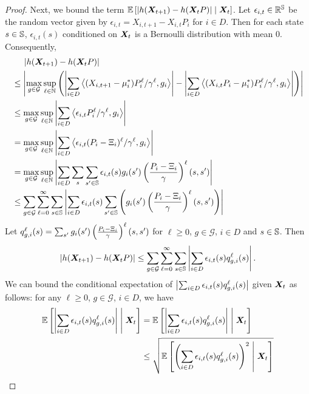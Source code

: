 \begin{proof}
Next, we bound the term $\mathbb{E}\left[\left\lvert h({\bm{X}}_{t+1})-h({\bm{X}}_tP)\right\rvert\;\middle|\;{\bm{X}}_t\right]$. 
Let $\epsilon_{i,t} \in \mathbb{R}^{\mathbb{S}}$ be the random vector given by $\epsilon_{i,t} = X_{i,t+1}-X_{i,t}P_i$ for $i\in D$. Then for each state $s\in\mathbb{S}$, $\epsilon_{i,t}(s)$ conditioned on ${\bm{X}}_t$ is a Bernoulli distribution with mean $0$. Consequently, 
\begin{align}
    \nonumber
    &\mspace{23mu} \left\lvert h({\bm{X}}_{t+1})-h({\bm{X}}_tP)\right\rvert\\
    \nonumber
    &\leq \left\lvert\max_{g\in \mathcal{G}} \sup_{\ell\in\mathbb{N}} \left(\left\lvert\sum_{i\in D}\left\langle (X_{i,t+1}-\mu_i^*)P_i^{\ell}/\gamma^{\ell}, g_i \right\rangle\right\rvert-\left\lvert\sum_{i\in D} \left\langle (X_{i,t}P_i-\mu_i^*)P_i^{\ell}/\gamma^{\ell}, g_i \right\rangle\right\rvert\right)\right\rvert\\ 
    \nonumber 
    &\leq \max_{g\in \mathcal{G}} \sup_{\ell\in\mathbb{N}} \left\lvert\sum_{i\in D}\left\langle \epsilon_{i,t}P_i^{\ell}/\gamma^{\ell}, g_i \right\rangle\right\rvert \\
    \nonumber
    &= \max_{g\in \mathcal{G}} \sup_{\ell\in\mathbb{N}} \left\lvert\sum_{i\in D}\left\langle \epsilon_{i,t}(P_i-\Xi_i)^{\ell}/\gamma^{\ell}, g_i \right\rangle\right\rvert\\
    \nonumber
    &=\max_{g\in \mathcal{G}} \sup_{\ell\in\mathbb{N}} \left\lvert\sum_{i\in D} \sum_s \sum_{s'\in\mathbb{S}} \epsilon_{i,t}(s)g_i(s') \left(\frac{P_i-\Xi_i}{\gamma}\right)^{\ell}(s,s')\right\rvert \\
    \nonumber
    &\leq \sum_{g\in \mathcal{G}} \sum_{\ell=0}^\infty \sum_{s\in\mathbb{S}}\left\lvert\sum_{i\in D} \epsilon_{i,t}(s) \sum_{s'\in\mathbb{S}}\left(g_i(s')\left(\frac{P_i-\Xi_i}{\gamma}\right)^{\ell}(s,s')\right)\right\rvert
\end{align}
Let $q_{g,i}^{\ell}(s)=\sum_{s'}g_i(s')\left(\frac{P_i-\Xi_i}{\gamma}\right)^{\ell}(s,s')$ for $\ell\geq 0$, $g\in \mathcal{G}$, $i\in D$ and $s\in \mathbb{S}$. 
Then 
\begin{equation}
    \label{eq:pf-subset-lyapunov:drift-1}
    \left\lvert h({\bm{X}}_{t+1})-h({\bm{X}}_tP)\right\rvert \leq  \sum_{g\in \mathcal{G}} \sum_{\ell=0}^\infty \sum_{s\in\mathbb{S}} \left\lvert\sum_{i\in D} \epsilon_{i,t}(s)q_{g,i}^{\ell}(s)\right\rvert. 
\end{equation}
We can bound the conditional expectation of $\left\lvert\sum_{i\in D} \epsilon_{i,t}(s)q_{g,i}^{\ell}(s)\right\rvert$ given ${\bm{X}}_t$ as follows: for any $\ell\geq 0$, $g\in \mathcal{G}$, $i\in D$, we have 
\begin{align}
    \nonumber
    \EE\mbracket{\abs{\sum_{i\in D} \epsilon_{i,t}(s)\tempm_{g,i}^{\ell}(s)} \givenmiddle \mX_t} 
    &= \EE\mbracket{\abs{\sum_{i\in D} \epsilon_{i,t}(s)\tempm_{g,i}^{\ell}(s)} \givenmiddle \mX_t}\\
    \nonumber
    &\leq \sqrt{\EE\mbracket{\bracket{\sum_{i\in D} \epsilon_{i,t}(s)\tempm_{g,i}^{\ell}(s)}^2 \givenmiddle \mX_t}}\\

\end{align}
\end{proof}
